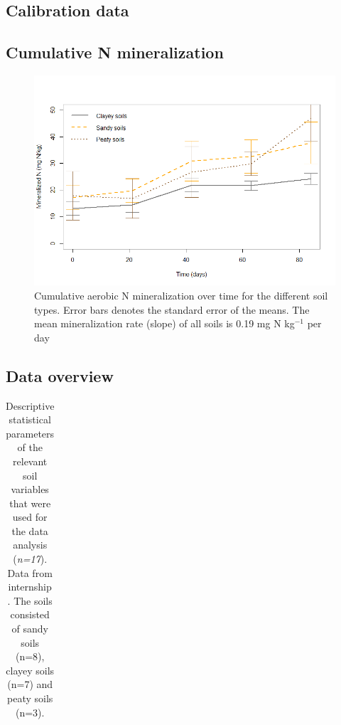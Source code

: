 \documentclass[10pt,twoside,dutch,english]{report}
\begin{document}
\begin{appendices}
\makeatletter
{}
\makeatother

\chapter{Calibration data}
	\label{chap: Calibration data}
\section{Cumulative N mineralization }
	\begin{figure}[h] %
	\centering
	\includegraphics[width=0.8\linewidth]{results_Ncum}
	\caption{Cumulative aerobic N mineralization over time for the different soil types. Error bars denotes the standard error of the means. The mean mineralization rate (slope) of all soils is 0.19 mg N kg$^{-1}$ per day}
	\label{fig:results_Ncum}
\end{figure}

\section{Data overview}
	\footnotesize 
			\begin{longtabu} to \textwidth{X[1.6,l]X[1,l]X[1,r]X[1,r]X[1,r]X[1,r]X[1,r]}
           \caption{Descriptive statistical parameters of the relevant soil variables that were used for the data analysis (\textit{n=17}). Data from internship \cite{Echeverri2014}. The soils consisted of sandy soils (n=8), clayey soils (n=7) and peaty soils (n=3).} \label{tab: results_char} \\
            	


\end{longtabu}
\end{appendices}
\end{document}
